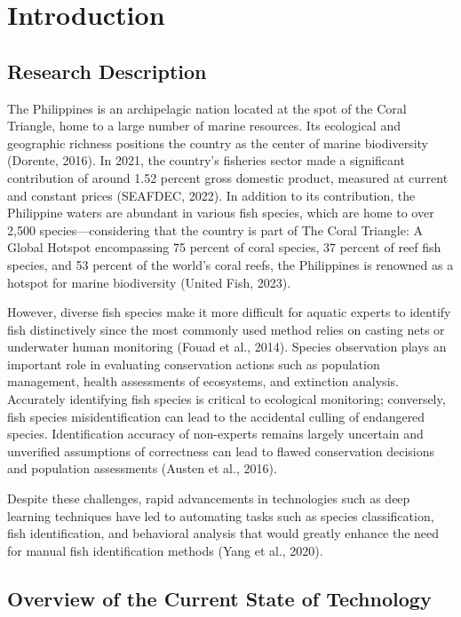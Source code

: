 \chapter{Introduction}

\section{Research Description}

The Philippines is an archipelagic nation located at the spot of the Coral Triangle, home to a large number of marine resources. Its ecological and geographic richness positions the country as the center of marine biodiversity (Dorente, 2016). In 2021, the country's fisheries sector made a significant contribution of around 1.52 percent gross domestic product, measured at current and constant prices (SEAFDEC, 2022). In addition to its contribution, the Philippine waters are abundant in various fish species, which are home to over 2,500 species—considering that the country is part of The Coral Triangle: A Global Hotspot encompassing 75 percent of coral species, 37 percent of reef fish species, and 53 percent of the world’s coral reefs, the Philippines is renowned as a hotspot for marine biodiversity (United Fish, 2023). 

However, diverse fish species make it more difficult for aquatic experts to identify fish distinctively since the most commonly used method relies on casting nets or underwater human monitoring (Fouad et al., 2014). Species observation plays an important role in evaluating conservation actions such as population management, health assessments of ecosystems, and extinction analysis. Accurately identifying fish species is critical to ecological monitoring; conversely, fish species misidentification can lead to the accidental culling of endangered species. Identification accuracy of non-experts remains largely uncertain and unverified assumptions of correctness can lead to flawed conservation decisions and population assessments (Austen et al., 2016).

Despite these challenges, rapid advancements in technologies such as deep learning techniques have led to automating tasks such as species classification, fish identification, and behavioral analysis that would greatly enhance the need for manual fish identification methods  (Yang et al., 2020).


\section{Overview of the Current State of Technology}

